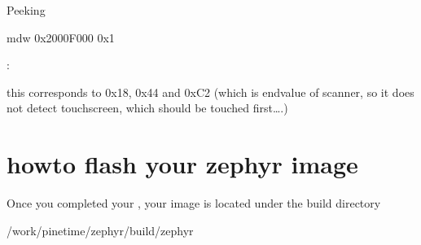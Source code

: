 \documentclass[letterpaper,10pt,english]{sphinxmanual}
\begin{document}
Peeking

\begin{sphinxVerbatim}[commandchars=\\\{\}]
\PYG{g+go}{Escape character is \PYGZsq{}\PYGZca{}]\PYGZsq{}.}
mdw 0x2000F000 0x1
\end{sphinxVerbatim}

:

this corresponds to 0x18, 0x44 and 0xC2 (which is endvalue of scanner, so it does not detect touchscreen, which should be touched first….)


\section{howto flash your zephyr image}
\label{\detokenize{hacking/writeprotection:howto-flash-your-zephyr-image}}\label{\detokenize{hacking/writeprotection:flashing}}\label{\detokenize{hacking/writeprotection::doc}}
Once you completed your  , your image is located under the build directory

\begin{sphinxVerbatim}[commandchars=\\\{\}]
  \PYGZti{}/work/pinetime/zephyr/build/zephyr






\end{sphinxVerbatim}
\end{document}
